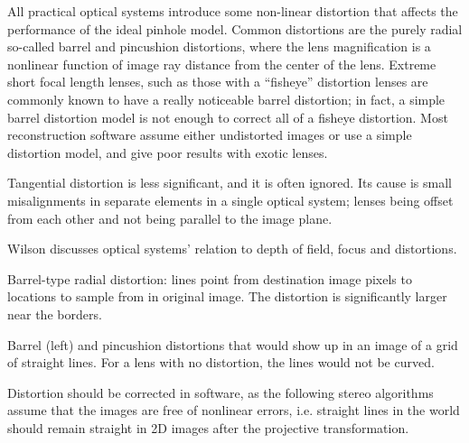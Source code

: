 

All practical optical systems introduce some non-linear distortion that affects the performance of the ideal pinhole model.
Common distortions are the purely radial so-called barrel and pincushion distortions, where the lens magnification is a nonlinear function of image ray distance from the center of the lens.
\cite{brown1966decentering}
Extreme short focal length lenses, such as those with a ``fisheye'' distortion lenses are commonly known to have a really noticeable barrel distortion; in fact, a simple barrel distortion model is not enough to correct all of a fisheye distortion.
Most reconstruction software assume either undistorted images or use a simple distortion model, and give poor results with exotic lenses.

Tangential distortion is less significant, and it is often ignored. Its cause is small misalignments in separate elements in a single optical system; lenses being offset from each other and not being parallel to the image plane. \cite{kingslake1989history}

Wilson \cite{wilson2004anton} discusses optical systems' relation to depth of field, focus and distortions.


{Barrel-type radial distortion: lines point from destination image pixels to locations to sample from in original image.
The distortion is significantly larger near the borders.}

{Barrel (left) and pincushion distortions that would show up in an image of a grid of straight lines. For a lens with no distortion, the lines would not be curved.}

Distortion should be corrected in software, as the following stereo algorithms assume that the images are free of nonlinear errors, i.e. straight lines in the world should remain straight in 2D images after the projective transformation.

